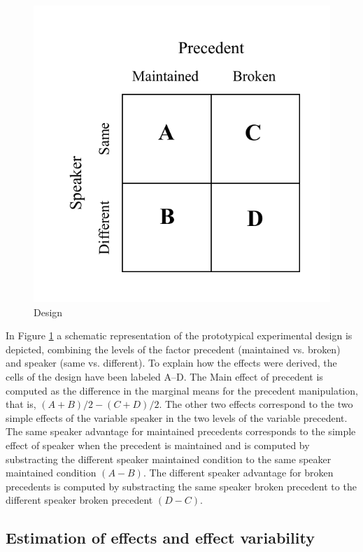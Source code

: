 \documentclass[doc,fignum,apacite,floatsintext]{apa6}
\begin{document}
\begin{figure}
\caption{Design}
\label{fig:design}
\centerline{\includegraphics[scale=.6]{design.pdf}}
\end{figure}

In Figure \ref{fig:design} a schematic representation of the prototypical experimental design is depicted, combining the levels of the factor precedent (maintained vs. broken) and speaker (same vs. different).  To explain how the effects were derived, the cells of the design have been labeled A--D.  The Main effect of precedent is computed as the difference in the marginal means for the precedent manipulation, that is, $(A+B)/2-(C+D)/2$. The other two effects correspond to the two simple effects of the variable speaker in the two levels of the variable precedent. The same speaker advantage for maintained precedents corresponds to the simple effect of speaker when the precedent is maintained and is computed by substracting the different speaker maintained condition to the same speaker maintained condition $(A-B)$. The different speaker advantage for broken precedents is computed by substracting the same speaker broken precedent to the different speaker broken precedent $(D-C)$. 

\subsection{Estimation of effects and effect variability}
\end{document}
